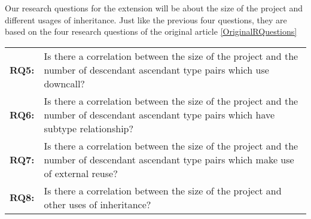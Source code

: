 \documentclass{uvamscse}
\begin{document}
Our research questions for the extension will be about the size of the project and different usages of inheritance. Just like the previous four questions, they are based on the four research questions of the original article \ref{OriginalRQuestions}

\begin{flushleft}
\begin{tabular}[t]{ p{20mm} p{110mm} }
  \bf{RQ5:} &  Is there a correlation between the size of the project and the number of descendant ascendant type pairs which use downcall? \\
  \bf{RQ6:} &  Is there a correlation between the size of the project and the number of descendant ascendant type pairs which have subtype relationship? \\
  \bf{RQ7:} &  Is there a correlation between the size of the project and the number of descendant ascendant type pairs which make use of external reuse?\\
  \bf{RQ8:} &  Is there a correlation between the size of the project and other uses of inheritance? \\
\end{tabular}
\end{flushleft}
\end{document}
